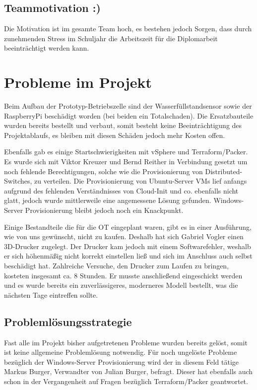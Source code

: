 \documentclass[
	headings=optiontotocandhead,%
	oneside,
	numbers=noenddot,%
	toc=flat, %
	10pt, %
	parskip=full, %
	listof=totoc, %
	listof=flat, %
	numbers=noenddot, %
	bibliography=totoc, %
	a4paper,DIV=14,
]{scrartcl}
\begin{document}
\subsection{Teammotivation \colorbox{green!30}{:)}} 
Die Motivation ist im gesamte Team hoch, es bestehen jedoch Sorgen, dass durch zunehmenden Stress im Schuljahr die Arbeitszeit für die Diplomarbeit beeinträchtigt werden kann.

\section{Probleme im Projekt}
Beim Aufbau der Prototyp-Betriebszelle sind der Wasserfüllstandsensor sowie der RaspberryPi beschädigt worden (bei beiden ein Totalschaden). Die Ersatzbauteile wurden bereits bestellt und verbaut, somit besteht keine Beeinträchtigung des Projektablaufs, es bleiben mit diesen Schäden jedoch mehr Kosten offen.

Ebenfalls gab es einige Startschwierigkeiten mit vSphere und Terraform/Packer. Es wurde sich mit Viktor Kreuzer und Bernd Reither in Verbindung gesetzt um noch fehlende Berechtigungen, solche wie die Provisionierung von Distributed-Switches, zu verteilen. Die Provisionierung von Ubuntu-Server VMs lief anfangs aufgrund des fehlenden Verständnisses von Cloud-Init und co. ebenfalls nicht glatt, jedoch wurde mittlerweile eine angemessene Lösung gefunden. Windows-Server Provisionierung bleibt jedoch noch ein Knackpunkt.

Einige Bestandteile die für die OT eingeplant waren, gibt es in einer Ausführung, wie von uns gewünscht, nicht zu kaufen. Deshalb hat sich Gabriel Vogler einen 3D-Drucker zugelegt. Der Drucker kam jedoch mit einem Softwarefehler, weshalb er sich höhenmäßig nicht korrekt einstellen ließ und sich im Anschluss auch selbst beschädigt hat. Zahlreiche Versuche, den Drucker zum Laufen zu bringen, kosteten insgesamt ca. 8 Stunden. Er musste anschließend eingeschickt werden und es wurde bereits ein zuverlässigeres, moderneres Modell bestellt, was die nächsten Tage eintreffen sollte.

\subsection{Problemlösungsstrategie}
Fast alle im Projekt bisher aufgetretenen Probleme wurden bereits gelöst, somit ist keine allgemeine Problemlösung notwendig. Für noch ungelöste Probleme bezüglich der Windows-Server Provisionierung wird der in diesem Feld tätige Markus Burger, Verwandter von Julian Burger, befragt. Dieser hat ebenfalls auch schon in der Vergangenheit auf Fragen bezüglich Terraform/Packer geantwortet.
\end{document}
